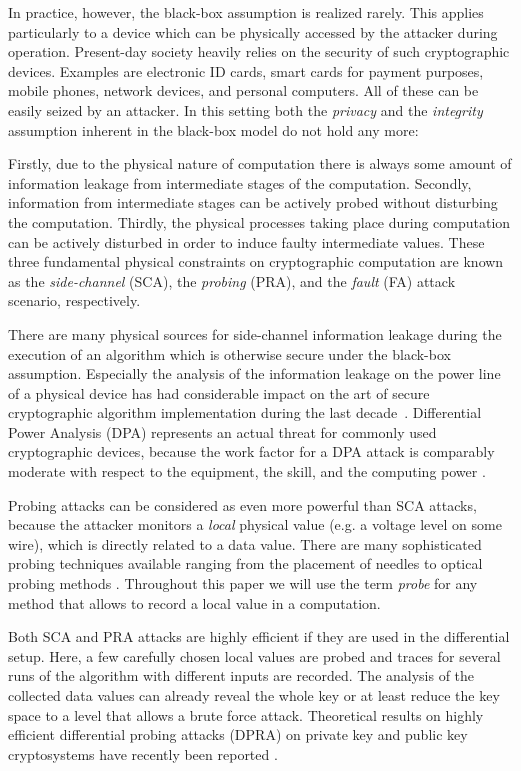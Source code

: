 \documentclass[11pt]{llncs}
\begin{document}
In practice, however, the black-box assumption is realized rarely.
This applies particularly to a device which can be physically
accessed by the attacker during operation. Present-day society
heavily relies on the security of such cryptographic devices.
Examples are electronic ID cards, smart cards for payment purposes,
mobile phones, network devices, and personal computers. All of these
can be easily seized by an attacker. In this setting both the
\emph{privacy} and the \emph{integrity} assumption inherent in the
black-box model do not hold any more:

Firstly, due to the physical nature of computation there is always
some amount of information leakage from intermediate stages of the computation.
Secondly, information from intermediate stages can be actively probed
without disturbing the computation.
Thirdly, the physical processes taking place during computation
can be actively disturbed in order to induce faulty intermediate values.
These three fundamental physical constraints on cryptographic computation
are known as
the \emph{side-channel} (SCA),
the \emph{probing} (PRA), and
the \emph{fault} (FA)
attack scenario, respectively.

There are many physical sources for side-channel information
leakage during the execution of an algorithm
which is otherwise secure under the black-box assumption.
Especially the analysis of the information leakage on
the power line of a physical device has had considerable
impact on the art of secure cryptographic algorithm implementation
during the last decade~\cite{Kocher1999DifferentialPowerAnalysis}.
Differential Power Analysis (DPA) represents an actual threat
for commonly used cryptographic devices, because the
work factor for a DPA attack is comparably moderate
with respect to the equipment, the skill, and the computing power
\cite{Chari1999TowardsSoundApproaches,Mangard2007PowerAnalysisAttacks,Messerges2000SecuringtheAES}.

Probing attacks can be considered as even more powerful
than SCA attacks, because the attacker
monitors a \emph{local} physical value (e.g. a voltage level on some wire),
which is directly related to a data value.
There are many sophisticated probing techniques available
ranging from the placement of needles to optical probing methods
\cite{Anderson1996TamperResistance-,Boit2008PhysicalTechniquesChip-Backside}.
Throughout this paper we will use the term \emph{probe}
for any method that allows to record
a local value in a computation.

Both SCA and PRA attacks are highly efficient if they are used
in the differential setup. Here, a few carefully chosen local values
are probed and traces for several runs of the algorithm
with different inputs are recorded.
The analysis of the collected data values can already reveal
the whole key or at least reduce the key space
to a level that allows a brute force attack.
Theoretical results on highly efficient differential probing attacks (DPRA) on
private key and public key cryptosystems have recently been reported
\cite{Handschuh1999ProbingAttackson,Schmidt2009ProbingAttackAES}.
\end{document}
